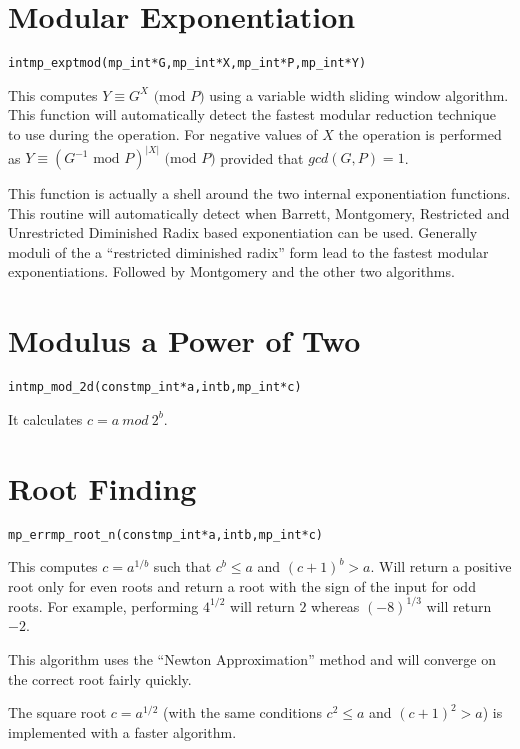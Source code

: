 \documentclass[synpaper]{book}
\def\mod{{\mathit\ mod\ }}
\begin{document}
\section{Modular Exponentiation}
\begin{alltt}
int mp_exptmod (mp_int * G, mp_int * X, mp_int * P, mp_int * Y)
\end{alltt}
This computes $Y \equiv G^X \mbox{ (mod }P\mbox{)}$ using a variable width sliding window algorithm.  This function
will automatically detect the fastest modular reduction technique to use during the operation.  For negative values of
$X$ the operation is performed as $Y \equiv (G^{-1} \mbox{ mod }P)^{\vert X \vert} \mbox{ (mod }P\mbox{)}$ provided that
$gcd(G, P) = 1$.

This function is actually a shell around the two internal exponentiation functions.  This routine will automatically
detect when Barrett, Montgomery, Restricted and Unrestricted Diminished Radix based exponentiation can be used.  Generally
moduli of the a ``restricted diminished radix'' form lead to the fastest modular exponentiations.  Followed by Montgomery
and the other two algorithms.

\section{Modulus a Power of Two}
\begin{alltt}
int mp_mod_2d(const mp_int *a, int b, mp_int *c)
\end{alltt}
It calculates $c = a \mod 2^b$.

\section{Root Finding}
\begin{alltt}
mp_err mp_root_n(const mp_int *a, int b, mp_int *c)
\end{alltt}
This computes $c = a^{1/b}$ such that $c^b \le a$ and $(c+1)^b > a$. Will return a positive root
only for even roots and return a root with the sign of the input for odd roots.  For example,
performing $4^{1/2}$ will return $2$ whereas $(-8)^{1/3}$ will return $-2$.

This algorithm uses the ``Newton Approximation'' method and will converge on the correct root
fairly quickly.

The square root  $c = a^{1/2}$ (with the same conditions $c^2 \le a$ and $(c+1)^2 > a$) is
implemented with a faster algorithm.
\end{document}
